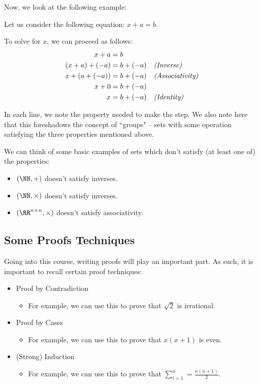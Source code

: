\documentclass[openany]{book}
\begin{document}
Now, we look at the following example:
\begin{example}
	Let us consider the following equation: $x + a = b$.
	
	To solve for $x$, we can proceed as follows:
	\begin{align*}
		x + a &= b && \\
		(x + a) + (-a) &= b + (-a) && \text{\textit{(Inverse)}} \\
		x + (a + (-a)) &= b + (-a) && \text{\textit{(Associativity)}} \\
		x + 0 &= b + (-a) && \\
		x &= b + (-a) && \text{\textit{(Identity)}}
	\end{align*}

	In each line, we note the property needed to make the step. We also note here that this foreshadows the concept of ``groups" -- sets with some operation satisfying the three properties mentioned above.
\end{example}

\begin{example}
	We can think of some basic examples of sets which don't satisfy (at least one of) the properties:
	\begin{itemize}
		\item $(\NN, +)$ doesn't satisfy inverses.
		\item $(\NN, \times)$ doesn't satisfy inverses.
		\item $(\RR^{n \times n}, \times)$ doesn't satisfy associativity.
	\end{itemize}
\end{example}

\subsection{Some Proofs Techniques}
Going into this course, writing proofs will play an important part. As such, it is important to recall certain proof techniques:
\begin{itemize}
	\item Proof by Contradiction
	\begin{itemize}
		\item For example, we can use this to prove that $\sqrt{2}$ is irrational.
	\end{itemize}
	\item Proof by Cases
	\begin{itemize}
		\item For example, we can use this to prove that $x(x+1)$ is even.
	\end{itemize}
	\item (Strong) Induction
	\begin{itemize}
		\item For example, we can use this to prove that $\sum_{i=1}^{n} = \frac{n(n+1)}{2}$.
	\end{itemize}
\end{itemize}
\end{document}
